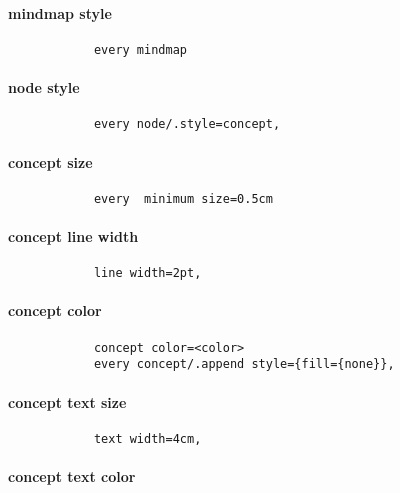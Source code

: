 \documentclass[12pt, a4paper, oneside]{book}
\begin{document}
		\paragraph{mindmap style}

			\begin{verbatim}
			every mindmap
			\end{verbatim}

		\paragraph{node style}

			\begin{verbatim}
			every node/.style=concept,
			\end{verbatim}

		\paragraph{concept size}

			\begin{verbatim}
			every  minimum size=0.5cm
			\end{verbatim}

		\paragraph{concept line width}

			\begin{verbatim}
			line width=2pt, 
			\end{verbatim}

		\paragraph{concept color}

			\begin{verbatim}
			concept color=<color>
			every concept/.append style={fill={none}},
			\end{verbatim}


		\paragraph{concept text size}

			\begin{verbatim}
			text width=4cm, 
			\end{verbatim}

		\paragraph{concept text color}
\end{document}
